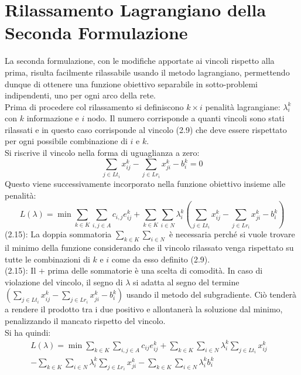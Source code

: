 \documentclass[12pt,a4paper,twoside]{report}
\begin{document}
	\section{Rilassamento Lagrangiano della Seconda Formulazione}
	La seconda formulazione, con le modifiche apportate ai vincoli rispetto alla prima, risulta facilmente rilassabile usando il metodo lagrangiano, permettendo dunque di ottenere una funzione obiettivo separabile in sotto-problemi indipendenti, uno per ogni arco della rete. \smallskip \\
	Prima di procedere col rilassamento si definiscono $k \times i$ penalità lagrangiane: $\lambda^k_i$ con $k$ informazione e $i$ nodo. Il numero corrisponde a quanti vincoli sono stati rilassati e in questo caso corrisponde al vincolo (2.9) che deve essere rispettato per ogni possibile combinazione di $i$ e $k$. \smallskip \\
	Si riscrive il vincolo nella forma di uguaglianza a zero:
	\begin{equation}
		\sum_{j \in Lt_i}x^k_{ij}-\sum_{j \in Lr_i}x^k_{ji}-b^k_i=0
	\end{equation}
	Questo viene successivamente incorporato nella funzione obiettivo insieme alle penalità:
	\begin{equation}
		L(\lambda)= \min \sum_{k \in K}\sum_{i,j \in A}c_{i,j}e^k_{ij}+\sum_{k \in K}\sum_{i \in N}\lambda^k_i (\sum_{j \in Lt_i}x^k_{ij}-\sum_{j \in Lr_i}x^k_{ji}-b^k_i)
	\end{equation}
	(2.15): La doppia sommatoria $\sum_{k \in K}\sum_{i \in N}$ è necessaria perché si vuole trovare il minimo della funzione considerando che il vincolo rilassato venga rispettato su tutte le combinazioni di $k$ e $i$ come da esso definito (2.9).\\
	(2.15): Il $+$ prima delle sommatorie è una scelta di comodità. In caso di violazione del vincolo, il segno di $\lambda$ si adatta al segno del termine $(\sum_{j \in Lt_i}x^k_{ij}-\sum_{j \in Lr_i}x^k_{ji}-b^k_i)$ usando il metodo del subgradiente. Ciò tenderà a rendere il prodotto tra i due positivo e allontanerà la soluzione dal minimo, penalizzando il mancato rispetto del vincolo. \smallskip \\
	Si ha quindi:
	\begin{equation}
		\begin{split}
			L(\lambda)= \min \sum_{k \in K}\sum_{i,j \in A} c_{ij}e^k_{ij} +\sum_{k \in K}\sum_{i \in N} \lambda^k_i \sum_{j \in Lt_i}x^k_{ij} & \\ - \sum_{k \in K}\sum_{i \in N} \lambda^k_i\sum_{j \in Lr_i}x^k_{ji} -\sum_{k \in K}\sum_{i \in N}\lambda^k_ib^k_i
		\end{split}
	\end{equation}
\end{document}
